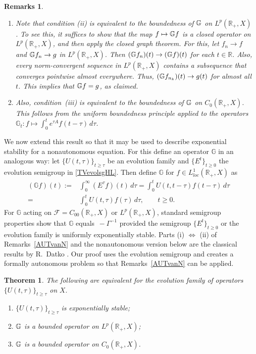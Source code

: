 \documentclass[10pt,psamsfonts,leqno]{siamltex}
\newtheorem{thm}[prop]{Theorem}
\newtheorem{rmks}[prop]{Remarks}
\newcommand{\bbR}{\mathbb{R}}
\newcommand{\bbG}{\mathbb{G}}
\renewcommand{\t}{\tau}
\newcommand{\CoRp}{{C_0(\bbR_+,X)}}
\newcommand{\LpRp}{{L^p(\bbR_+,X)}}
\begin{document}
\begin{rmks}\label{vNTR}
\begin{enumerate}
\item[(a)]  Note  that condition (ii)
is equivalent to the boundedness
of $\Bbb{G}$ on $L^p(\bbR_+,X)$. To see this, it
suffices to show that the map $f\mapsto \Bbb{G}f$ is a
closed operator on $L^p(\bbR_+,X)$, and then apply the
closed graph theorem.  For this, let $f_n\to f$ and
$\Bbb{G}f_n\to g$ in $L^p(\bbR_+,X)$.  Then
$(\Bbb{G}f_n)(t)\to (\Bbb{G}f)(t)$ for each $t\in \bbR$.
Also,  every norm-convergent sequence in $L^p(\bbR_+,X)$
contains a subsequence that converges pointwise almost
everywhere. Thus, $(\Bbb{G}f_{n_k})(t)\to g(t)$ for almost
all $t$.  This implies that $\Bbb{G}f=g$, as claimed.

\item[(b)]  Also, condition~(iii) is
equivalent to the boundedness of $\Bbb{G}$
on $C_0(\bbR_+,X)$. This follows from
the uniform boundedness principle applied
to the  operators $\bbG_t :f\mapsto
\int_0^te^{\tau A}f(t -\tau)\,d\tau$.
\end{enumerate}
\end{rmks}

We now extend this result so that it may be used to
describe exponential stability for a nonautonomous equation.
For this define
an operator $\bbG$ in an analogous way: let
$\{U(t,\tau)\}_{t\ge\tau}$ be an evolution family  and
$\{E^t\}_{t\ge0}$ the evolution semigroup in \eqref{TVevolsgHL}.
Then define $\bbG$ for $f\in L^1_{loc}(\bbR_+,X)$ as
\begin{equation}\label{TVbbG}
\begin{aligned}
(\bbG f)(t):=&\int_0^\infty (E^\tau f)(t)\,d\tau
=\int_0^t U(t,t-\tau)f(t-\tau)\,d\tau  \\
=&\int_0^t U(t,\tau)f(\t)\,d\tau,\qquad t\ge0.
\end{aligned}
\end{equation}
For $\bbG$ acting on $\mathcal{F}=C_{00}(\bbR_+,X)$ or $\LpRp$,
standard semigroup properties show that $\bbG$ equals
$\,-\Gamma^{-1}$ provided the semigroup $\{E^t\}_{t\ge 0}$ or
the evolution family is uniformly exponentially stable.
Parts (i) $\Leftrightarrow$ (ii) of Remarks~\ref{AUTvanN}
 and the nonautonomous version below are the classical results
by R.~Datko \cite{Datko}.  Our proof uses the evolution semigroup and
creates
a formally autonomous problem so that Remarks~\ref{AUTvanN} can be
applied.

\begin{thm}\label{TVvanN} The following are equivalent for the
evolution family of operators $\{U(t,\tau)\}_{t\ge\tau}$ on $X$.
\begin{enumerate}
\item $\{U(t,\tau)\}_{t\ge\tau}$ is exponentially stable;
\item $\Bbb{G}$ is a bounded operator on $\LpRp$;
\item $\Bbb{G}$ is a bounded operator on $\CoRp$.
\end{enumerate}
\end{thm}
\end{document}
